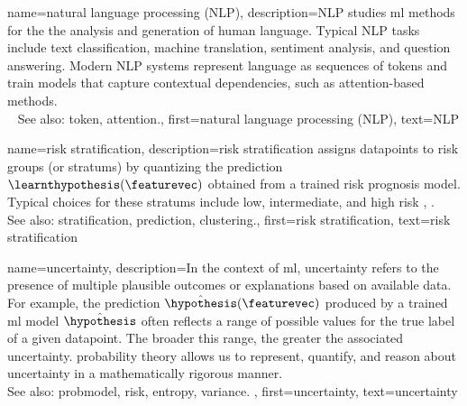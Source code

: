 {name={natural language processing (NLP)},
	description={NLP 
 		studies \gls{ml} methods for the the analysis and generation of human language. 
  		Typical NLP tasks include text \gls{classification}, machine translation, 
  		sentiment analysis, and question answering. Modern NLP systems represent 
  		language as \glspl{sequence} of \glspl{token} and train \glspl{model} that 
  		capture contextual dependencies, such as \gls{attention}-based methods.
		\\ 
  		See also: \gls{token}, \gls{attention}.}, 
	first={natural language processing (NLP)}, 
	text={NLP}
}

{name={risk stratification},
	description={\Gls{risk} \gls{stratification} assigns 
		\glspl{datapoint} to \gls{risk} groups (or \glspl{stratum}) by 
		quantizing the \gls{prediction} $\learnthypothesis(\featurevec)$ 
		obtained from a trained \gls{risk} prognosis \gls{model}. Typical choices for these 
		\glspl{stratum} include low, intermediate, and high \gls{risk} 
             	\cite{Collins:2012aa}, \cite{Steyerberg2019}.
		\\
		See also: \gls{stratification}, \gls{prediction}, \gls{clustering}.},
	first={risk stratification},
	text={risk stratification}
}

{name={uncertainty},
	description={In the context of \gls{ml}, uncertainty refers to the presence of multiple 
		plausible \glspl{outcome} or \glspl{explanation} based on available \gls{data}. For example, the 
		\gls{prediction} $\hat{\hypothesis}(\featurevec)$ produced by a trained \gls{ml} \gls{model} $\hat{\hypothesis}$
	 	often reflects a range of possible values for the true \gls{label} of a given \gls{datapoint}. 
	 	The broader this range, the greater the associated uncertainty. \Gls{probability} theory 
	 	allows us to represent, quantify, and reason about uncertainty in a 
	 	mathematically rigorous manner.
					\\ 
		See also: \gls{probmodel}, \gls{risk}, \gls{entropy}, \gls{variance}. },
	first={uncertainty},
	text={uncertainty}
}

